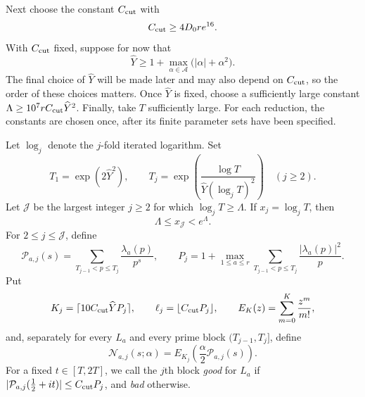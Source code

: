 \documentclass[oneside, 12pt]{amsart}
\theoremstyle{definition}
\begin{document}
{		Next choose the constant $C_{\rm cut}$ with
		\begin{equation}\label{baseBadCutoffChoice}
			C_{\rm cut}\geq4 D_0r e^{16}.
		\end{equation}
		With $C_{\rm cut}$ fixed, suppose for now that
		\begin{equation}\label{YDominatesParameters}
			\widehat Y\geq1+\max_{\alpha\in\mathscr A}
			\bigl(|\alpha|+\alpha^2\bigr).
		\end{equation}
		The final choice of $\widehat Y$ will be made later and may
		also depend on $C_{\rm cut}$, so the order of these choices matters.
		Once $\widehat Y$ is fixed, choose a sufficiently large constant
		$\Lambda\geq10^7rC_{\rm cut}\widehat Y^2$.
		Finally, take $T$ sufficiently large. 
		For each reduction, the constants are chosen once, after its finite
		parameter sets have been specified.
		
		Let \(\log_j\) denote the \(j\)-fold iterated logarithm.  Set
		\[
		T_1=\exp(2\widehat Y^2),\qquad
		T_j=\exp\left(\frac{\log T}{\widehat Y(\log_jT)^2}\right)
		\quad(j\geq2).
		\]
		Let \(\mathscr J\)
		be the largest integer \(j\geq2\) for which
		\(\log_jT\geq\Lambda\).  If $x_j=\log_jT$, then
		\begin{equation}\label{terminalScaleBounds}
			\Lambda\leq x_{\mathscr J}<e^\Lambda.
		\end{equation}
		For
		\(2\leq j\leq\mathscr J\), define
		\[
		\mathcal P_{a,j}(s)=\sum_{T_{j-1}<p\leq T_j}
		\frac{\lambda_a(p)}{p^s},\qquad
		P_j=1+\max_{1\leq a\leq r}
		\sum_{T_{j-1}<p\leq T_j}\frac{|\lambda_a(p)|^2}{p}.
		\]
		Put
		\begin{equation}\label{factorwiseCutoffs}
			K_j=\lceil10C_{\rm cut}\widehat YP_j\rceil,
			\qquad \ell_j=\lfloor C_{\rm cut}P_j\rfloor,
			\qquad E_K(z)=\sum_{m=0}^K\frac{z^m}{m!},
		\end{equation}
		and, separately for every \(L_a\) and every prime block $(T_{j-1},T_j]$, define
		\begin{equation}\label{factorwiseNDefinition}
			\mathcal N_{a,j}(s;\alpha)=
			E_{K_j}\left(\frac{\alpha}{2}\mathcal P_{a,j}(s)\right).
		\end{equation}
		For a fixed $t\in[T,2T]$, we call the $j$th block
		\emph{good} for $L_a$ if
		$|\mathcal P_{a,j}(\tfrac12+it)|\leq C_{\rm cut}P_j$,
		and \emph{bad} otherwise.
		
}
\end{document}
